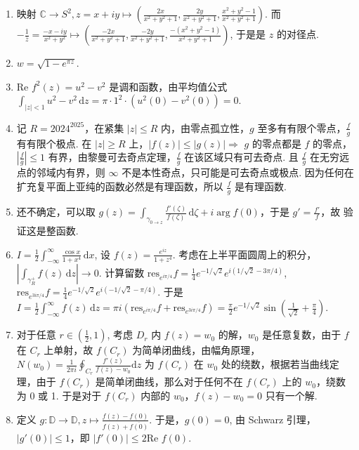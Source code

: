 \begin{enumerate}
	\item 映射 $\mathbb{C}\to S^{2},z=x+iy\mapsto\left( \frac{2x}{x^{2}+y^{2}+1},\frac{2y}{x^{2}+y^{2}+1},\frac{x^{2}+y^{2}-1}{x^{2}+y^{2}+1} \right)$. 而 $-\frac{1}{\overline{z}}=\frac{-x-iy}{x^{2}+y^{2}}\mapsto\left( \frac{-2x}{x^{2}+y^{2}+1},\frac{-2y}{x^{2}+y^{2}+1},\frac{-(x^{2}+y^{2}-1)}{x^{2}+y^{2}+1} \right)$, 于是是 $z$ 的对径点.
	\item $w=\sqrt{ 1-e^{ \pi z } }$.
	\item $\text{Re }f^{2}(z)=u^{2}-v^{2}$ 是调和函数，由平均值公式 $\int_{\lvert z \rvert<1}^{} u^{2}-v^{2} \, \mathrm{d}z=\pi \cdot1^{2}\cdot(u^{2}(0)-v^{2}(0))=0$.
	\item 记 $R=2024^{2025}$，在紧集 $\lvert z \rvert\leq R$ 内，由零点孤立性，$g$ 至多有有限个零点，$\frac{f}{g}$ 有有限个极点. 在 $\lvert z \rvert\geq R$ 上，$\lvert f(z) \rvert\leq \lvert g(z) \rvert\Rightarrow$ $g$ 的零点都是 $f$ 的零点， $\left\lvert  \frac{f}{g}  \right\rvert\leq1$ 有界，由黎曼可去奇点定理，$\frac{f}{g}$ 在该区域只有可去奇点. 且 $\frac{f}{g}$ 在无穷远点的邻域内有界，则 $\infty$ 不是本性奇点，只可能是可去奇点或极点. 因为任何在扩充复平面上亚纯的函数必然是有理函数，所以 $\frac{f}{g}$ 是有理函数.
	\item 还不确定，可以取 $g(z)=\int_{\gamma_{0\to z}}^{} \frac{f'(\zeta)}{f(\zeta)} \, \mathrm{d}\zeta+i\arg f(0)$，于是 $g'=\frac{f'}{f}$，故 验证这是整函数.
	\item $I=\frac{1}{2}\int_{-\infty}^{\infty} \frac{\cos x}{1+x^{4}} \, \mathrm{d}x$, 设 $f(z)=\frac{e^{ iz }}{1+z^{4}}$. 考虑在上半平面圆周上的积分，$\left\lvert  \int_{\gamma_{R}^{+}}^{} f(z) \, \mathrm{d}z  \right\rvert\to0$. 计算留数 $\mathrm{res}_{e^{ i\pi/4  }}f=\frac{1}{4}e^{ -1/\sqrt{ 2  } }e^{ i(1/\sqrt{ 2 }-3\pi/4 ) }$, $\mathrm{res}_{e^{ 3i\pi/4  }}f=\frac{1}{4}e^{ -1/\sqrt{ 2 } }e^{ i(-1/\sqrt{ 2 }-\pi/4 ) }$. 于是 $I=\frac{1}{2}\int_{-\infty}^{\infty} f (z) \, \mathrm{d}z=\pi i(\mathrm{res}_{e^{ i\pi/4  }}f+\mathrm{res}_{e^{ 3i\pi/4  }}f)=\frac{\pi}{2}e^{ -1/\sqrt{ 2 } }\sin\left( \frac{1}{\sqrt{ 2 }}+\frac{\pi}{4}  \right)$.
	\item 对于任意 $r\in\left( \frac{1}{2},1 \right)$, 考虑 $D_{r}$ 内 $f(z)=w_0$ 的解，$w_0$ 是任意复数，由于 $f$ 在 $C_{r}$ 上单射，故 $f(C_{r})$ 为简单闭曲线，由幅角原理，$N(w_0)=\frac{1}{2\pi i}\oint_{C_{r}}\frac{f'(z)}{f(z)-w_0}\mathrm{d}z$ 为 $f(C_{r})$ 在 $w_0$ 处的绕数，根据若当曲线定理，由于 $f(C_{r})$ 是简单闭曲线，那么对于任何不在 $f(C_{r})$ 上的 $w_0$，绕数为 0 或 1. 于是对于 $f(C_{r})$ 内部的 $w_0$，$f(z)-w_0=0$ 只有一个解.
	\item 定义 $g:\mathbb{D}\to \mathbb{D},z\mapsto\frac{f(z)-f(0)}{f(z)+\overline{f(0)}}$. 于是，$g(0)=0$, 由 Schwarz 引理，$\lvert g'(0) \rvert\leq1$，即 $\lvert f'(0) \rvert\leq2\text{Re }f(0)$.
\end{enumerate}

